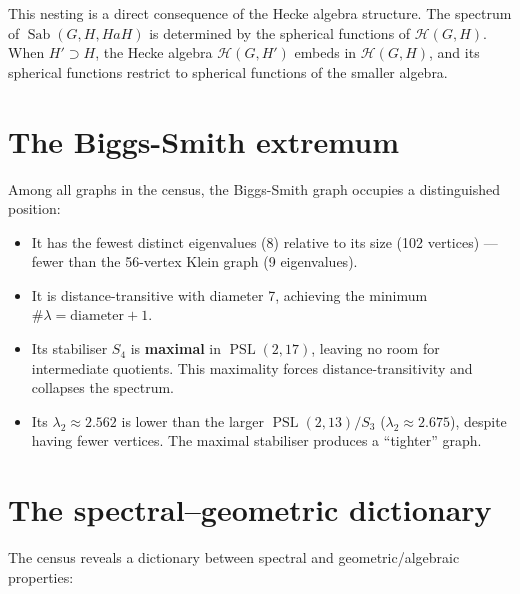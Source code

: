 \documentclass[11pt,a4paper]{article}
\theoremstyle{plain}
\theoremstyle{definition}
\theoremstyle{remark}
\newcommand{\PSL}{\operatorname{PSL}}
\newcommand{\Sab}{\operatorname{Sab}}
\begin{document}
This nesting is a direct consequence of the Hecke algebra structure.
The spectrum of $\Sab(G, H, HaH)$ is determined by the spherical functions
of $\mathcal{H}(G, H)$. When $H' \supset H$, the Hecke algebra
$\mathcal{H}(G, H')$ embeds in $\mathcal{H}(G, H)$, and its spherical
functions restrict to spherical functions of the smaller algebra.


\section{The Biggs-Smith extremum}

Among all graphs in the census, the Biggs-Smith graph occupies a
distinguished position:

\begin{itemize}[noitemsep]
\item It has the fewest distinct eigenvalues (8) relative to its size
  (102 vertices) --- fewer than the 56-vertex Klein graph (9 eigenvalues).
\item It is distance-transitive with diameter 7, achieving the minimum
  $\#\lambda = \text{diameter} + 1$.
\item Its stabiliser $S_4$ is \textbf{maximal} in $\PSL(2,17)$, leaving
  no room for intermediate quotients. This maximality forces
  distance-transitivity and collapses the spectrum.
\item Its $\lambda_2 \approx 2.562$ is lower than the larger
  $\PSL(2,13)/S_3$ ($\lambda_2 \approx 2.675$), despite having fewer
  vertices. The maximal stabiliser produces a ``tighter'' graph.
\end{itemize}


\section{The spectral--geometric dictionary}

The census reveals a dictionary between spectral and geometric/algebraic
properties:
\end{document}
